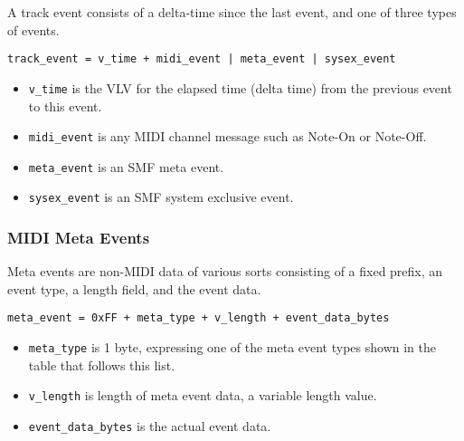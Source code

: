    A track event consists of a delta-time since the last event, and one of
   three types of events.
 
   \texttt{track\_event = v\_time + midi\_event | meta\_event | sysex\_event}
 
   \begin{itemize}
      \item \texttt{v\_time} is the VLV for the elapsed time
         (delta time) from the previous event to this event.
      \item \texttt{midi\_event} is any MIDI channel message such as Note-On
         or Note-Off.
      \item \texttt{meta\_event} is an SMF meta event.
      \item \texttt{sysex\_event} is an SMF system exclusive event.
   \end{itemize}

\subsubsection{MIDI Meta Events}
\label{subsubsec:midi_meta_events}

   Meta events are non-MIDI data of various sorts consisting of a fixed prefix,
   an event type, a length field, and the event data.
 
   \texttt{meta\_event = 0xFF + meta\_type + v\_length + event\_data\_bytes}

   \begin{itemize}
      \item \texttt{meta\_type} is 1 byte, expressing one of the meta event
         types shown in the table that follows this list.
      \item \texttt{v\_length} is length of meta event data, a variable
         length value.
      \item \texttt{event\_data\_bytes} is the actual event data.
   \end{itemize}

